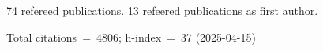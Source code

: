 74 refereed publications. 13 refeered publications as first author.

Total citations~=~4806; h-index~=~37 (2025-04-15)